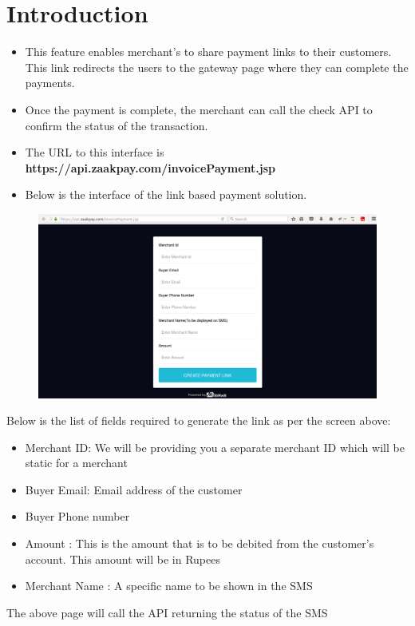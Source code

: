 \documentclass{article}
\begin{document}
\section{Introduction}
\begin{itemize}
\item This feature enables merchant's to share payment links to their customers. This link redirects the users to the gateway page where they can complete the payments.
\item Once the payment is complete, the merchant can call the check API to confirm the status of the transaction.
\item The URL to this interface is  {\bfseries https://api.zaakpay.com/invoicePayment.jsp}\\
\item Below is the interface of the link based payment solution.
\end{itemize}
\begin{figure}[H]
\centering
\includegraphics[width=7.4in]{invoicepage.png}
\end{figure}
\newpage
Below is the list of fields required to generate the link as per the screen above:
\begin{itemize}
\item Merchant ID: We will be providing you a separate merchant ID which will be static for a merchant
\item Buyer Email: Email address of the customer
\item Buyer Phone number
\item Amount : This is the amount that is to be debited from the customer's account. This amount will be in Rupees
\item Merchant Name : A specific name to be shown in the SMS
\end{itemize}
The above page will call the API returning the status of the SMS
\end{document}
